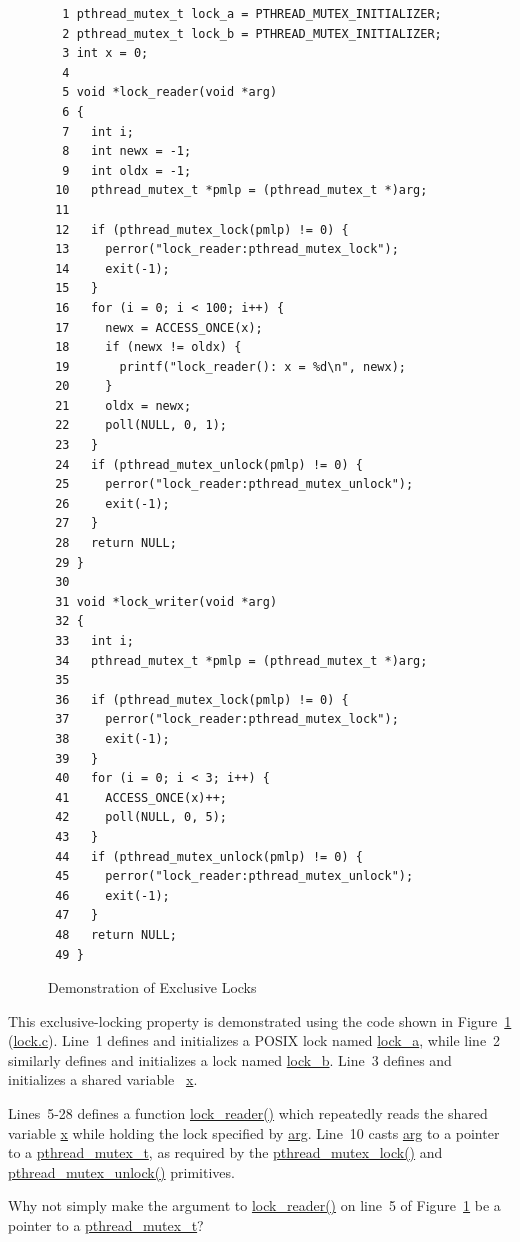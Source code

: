 \begin{figure}[tbp]
{ \scriptsize
\begin{verbatim}
  1 pthread_mutex_t lock_a = PTHREAD_MUTEX_INITIALIZER;
  2 pthread_mutex_t lock_b = PTHREAD_MUTEX_INITIALIZER;
  3 int x = 0;
  4 
  5 void *lock_reader(void *arg)
  6 {
  7   int i;
  8   int newx = -1;
  9   int oldx = -1;
 10   pthread_mutex_t *pmlp = (pthread_mutex_t *)arg;
 11 
 12   if (pthread_mutex_lock(pmlp) != 0) {
 13     perror("lock_reader:pthread_mutex_lock");
 14     exit(-1);
 15   }
 16   for (i = 0; i < 100; i++) {
 17     newx = ACCESS_ONCE(x);
 18     if (newx != oldx) {
 19       printf("lock_reader(): x = %d\n", newx);
 20     }
 21     oldx = newx;
 22     poll(NULL, 0, 1);
 23   }
 24   if (pthread_mutex_unlock(pmlp) != 0) {
 25     perror("lock_reader:pthread_mutex_unlock");
 26     exit(-1);
 27   }
 28   return NULL;
 29 }
 30 
 31 void *lock_writer(void *arg)
 32 {
 33   int i;
 34   pthread_mutex_t *pmlp = (pthread_mutex_t *)arg;
 35 
 36   if (pthread_mutex_lock(pmlp) != 0) {
 37     perror("lock_reader:pthread_mutex_lock");
 38     exit(-1);
 39   }
 40   for (i = 0; i < 3; i++) {
 41     ACCESS_ONCE(x)++;
 42     poll(NULL, 0, 5);
 43   }
 44   if (pthread_mutex_unlock(pmlp) != 0) {
 45     perror("lock_reader:pthread_mutex_unlock");
 46     exit(-1);
 47   }
 48   return NULL;
 49 }
\end{verbatim}
}
\caption{Demonstration of Exclusive Locks}
\label{fig:toolsoftrade:Demonstration of Exclusive Locks}
\end{figure}

This exclusive-locking property is demonstrated using the code shown in
Figure~\ref{fig:toolsoftrade:Demonstration of Exclusive Locks}
(\url{lock.c}).
Line~1 defines and initializes a POSIX lock named \url{lock_a}, while
line~2 similarly defines and initializes a lock named \url{lock_b}.
Line~3 defines and initializes a shared variable ~\url{x}.

Lines~5-28 defines a function \url{lock_reader()} which repeatedly
reads the shared variable \url{x} while holding
the lock specified by \url{arg}.
Line~10 casts \url{arg} to a pointer to a \url{pthread_mutex_t}, as
required by the \url{pthread_mutex_lock()} and \url{pthread_mutex_unlock()}
primitives.

\QuickQuiz{}
	Why not simply make the argument to \url{lock_reader()}
	on line~5 of
	Figure~\ref{fig:toolsoftrade:Demonstration of Exclusive Locks}
	be a pointer to a \url{pthread_mutex_t}?
 \QuickQuizEnd

